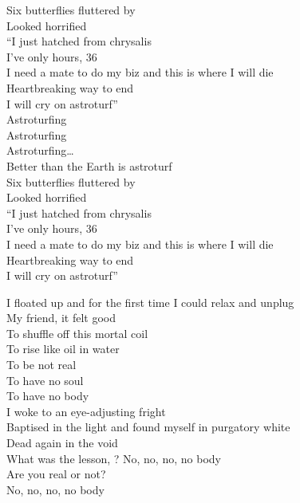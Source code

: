 Six butterflies fluttered by \\
Looked horrified \\
``I just hatched from chrysalis \\
I've only hours, 36 \\
I need a mate to do my biz and this is where I will die \\
Heartbreaking way to end \\
I will cry on astroturf'' \\

Astroturfing \\
Astroturfing \\
Astroturfing… \\
Better than the Earth is astroturf \\

Six butterflies fluttered by \\
Looked horrified \\
``I just hatched from chrysalis \\
I've only hours, 36 \\
I need a mate to do my biz and this is where I will die \\
Heartbreaking way to end \\
I will cry on astroturf'' \\




I floated up and for the first time I could relax and unplug \\
My friend, it felt good \\

To shuffle off this mortal coil \\
To rise like oil in water \\

To be not real \\
To have no soul \\
To have no body \\

I woke to an eye-adjusting fright \\
Baptised in the light and found myself in purgatory white \\
Dead again in the void \\

What was the lesson, ?
No, no, no, no body \\
Are you real or not? \\
No, no, no, no body \\


